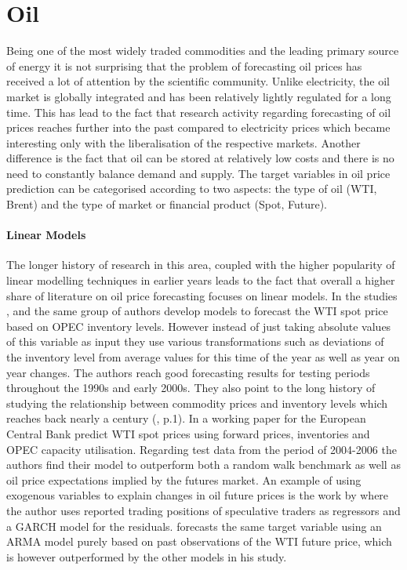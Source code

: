 \section{Oil}
Being one of the most widely traded commodities and the leading primary source of energy it is not surprising that the problem of forecasting oil prices has received a lot of attention by the scientific community. Unlike electricity, the oil market is  globally integrated and has been relatively lightly regulated for a long time.
This has lead to the fact that research activity regarding forecasting of oil prices reaches further into the past compared to electricity prices which became interesting only with the liberalisation of the respective markets.
Another difference is the fact that oil can be stored at relatively low costs and there is no need to constantly balance demand and supply. The target variables in oil price prediction can be categorised according to two aspects: the type of oil (WTI, Brent) and the type of market or financial product (Spot, Future). 

\paragraph{Linear Models}
The longer history of research in this area, coupled with the higher popularity of linear modelling techniques in earlier years leads to the fact that overall a higher share of literature on oil price forecasting focuses on linear models. In the studies \cite{ye_forecasting_2002}, \cite{ye_monthly_2005} and \cite{ye_forecasting_2006} the same group of authors develop models to forecast the WTI spot price based on OPEC inventory levels. However instead of just taking absolute values of this variable as input they use various transformations such as deviations of the inventory level from average values for this time of the year as well as year on year changes.  The authors reach good forecasting results for testing periods throughout the 1990s and early 2000s. They also point to the long history of studying the relationship between commodity prices and inventory levels which reaches back nearly a century (\cite{ye_forecasting_2006}, p.1).
In a working paper for the European Central Bank \cite{dees_assessing_2008} predict WTI spot prices using forward prices, inventories and OPEC capacity utilisation. Regarding test data from the period of 2004-2006 the authors find their model to outperform both a random walk benchmark as well as oil price expectations implied by the futures market. An example of using exogenous variables to explain changes in oil future prices is the work by \cite{bu_price_2011} where the author uses reported trading positions of speculative traders as regressors and a GARCH model for the residuals. \cite{moshiri_forecasting_2006} forecasts the same target variable using an ARMA  model purely based on past observations of the WTI future price, which is however outperformed by the other models in his study. 


